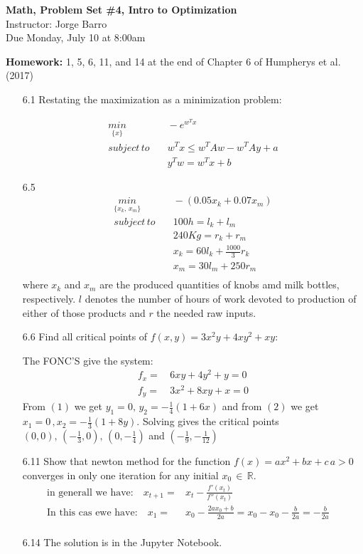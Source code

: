 \documentclass[letterpaper,12pt]{article}
\theoremstyle{definition}
\begin{document}
\begin{flushleft}
   \textbf{\large{Math, Problem Set \#4, Intro to Optimization}} \\[5pt] Instructor: Jorge Barro \\[5pt]
   Due Monday, July 10 at 8:00am
\end{flushleft}
\textbf{Homework:} 1, 5, 6, 11, and 14 at the end of Chapter 6 of Humpherys et al. (2017) \\

\begin{itemize}
\item[6.1] Restating the maximization as a minimization problem:

\begin{align*}
\underset{\{x\}}{min}& \quad -e^{w^Tx}\\
subject \, to&  \quad w^Tx \leq w^TAw-w^TAy+a\\
& \quad y^Tw = w^Tx+b
\end{align*}

\item[6.5]
\begin{align*}
\underset{\{x_k,\, x_m\}}{min}& \quad -(0.05x_k + 0.07 x_m)\\
subject \, to&  \quad 100h =  l_k + l_m\\
& \quad 240Kg = r_k + r_m\\
& \quad x_k= 60l_k + \frac{1000}{3}r_k\\
& \quad x_m = 30 l_m + 250r_m\\
\end{align*}
where $x_k$ and $x_m$ are the produced quantities of knobs amd milk bottles, respectively. $l$ denotes the number of hours of work devoted to production of either of those products and $r$ the needed raw inputs. 
\item[6.6]
Find all critical points of $f(x, y) = 3x^2 y + 4xy^2 + xy $:

The FONC'S give the system:
\begin{align}
f_x =&\,  6xy + 4y^2+y = 0\\
f_y =& \, 3x^2 + 8xy +x = 0
\end{align}
From $(1)$ we get $y_1 = 0,  \, y_2=-\frac{1}{4}(1+6x)$ and from $(2)$ we get $x_1=0 \, , x_2=-\frac{1}{3}(1+8y)$. Solving gives the critical points $(0,0),\, (-\frac{1}{3}, 0), \, (0, -\frac{1}{4})$ and $ (-\frac{1}{9}, -\frac{1}{12})$
\item[6.11] Show that newton method for the function $f(x)=ax^2+bx+c \, a>0$ converges in only one iteration for any initial $x_0 \, \in\,  \mathbb{R}$.
\begin{align*}
\text{in generall we have:} \quad x_{t+1} =& x_t - \frac{f'(x_t)}{f''(x_t)}\\
\text{In this cas ewe have:} \quad x_1 = &x_0 - \frac{2ax_0+b}{2a} =x_0 -x_0 -\frac{b}{2a} = -\frac{b}{2a} \quad \\
\end{align*}
\item[6.14]
The solution is in the Jupyter Notebook.
\end{itemize}
\end{document}
